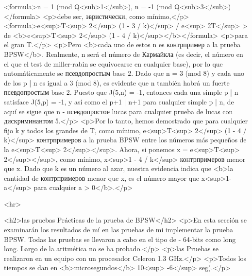<formula>n = 1 (mod Q<sub>1</sub>), n = -1 (mod Q<sub>3</sub>)</formula>
<p>debe ser, эвристически, como mínimo,</p>
<formula>e<sup>T<sup> 2</sup> (1 - 3 / k)</sup> / e<sup> 2T</sup> > de <b>e<sup>T<sup> 2</sup> (1 - 4 / k)</sup></b></formula>
<p>para el gran T.</p>
<p>Pero <b>cada uno de estos n es контрпример a la prueba BPSW</b>. Realmente, n será el número de Кармайкла (es decir, el número en el que el test de miller-rabin se equivocarse en cualquier base), por lo que automáticamente se псевдопростым base 2. Dado que n = 3 (mod 8) y cada uno de los p | n es igual a 3 (mod 8), es evidente que n también habrá un fuerte псевдопростым base 2. Puesto que J(5,n) = -1, entonces cada una simple p | n satisface J(5,p) = -1, y así como el p+1 | n+1 para cualquier simple p | n, de aquí se sigue que n - псевдопростое lucas para cualquier prueba de lucas con дискриминантом 5.</p>
<p>Por lo tanto, hemos demostrado que para cualquier fijo k y todos los grandes de T, como mínimo, e<sup>T<sup> 2</sup> (1 - 4 / k)</sup> контрпримеров a la prueba BPSW entre los números más pequeños de la e<sup>T<sup> 2</sup></sup>. Ahora, si ponemos x = e<sup>T<sup> 2</sup></sup>, como mínimo, x<sup>1 - 4 / k</sup> контрпримеров menor que x. Dado que k es un número al azar, nuestra evidencia indica que <b>la cantidad de контрпримеров menor que x, es el número mayor que x<sup>1-a</sup> para cualquier a > 0</b>.</p>

<hr>

<h2>las pruebas Prácticas de la prueba de BPSW</h2>
<p>En esta sección se examinarán los resultados de mí en las pruebas de mi implementar la prueba BPSW. Todas las pruebas se llevaron a cabo en el tipo de - 64-bits como long long. Largo de la aritmética no se ha probado.</p>
<p>las Pruebas se realizaron en un equipo con un procesador Celeron 1.3 GHz.</p>
<p>Todos los tiempos se dan en <b>microsegundos</b> 10<sup> -6</sup> seg).</p>

